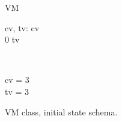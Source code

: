 \begin{figure}[H]
\centering
\begin{class}{VM}
\begin{state}
cv, tv: \integer
{} \leq  cv 
\\
0 \leq  tv 
\end{state} 
\\
\begin{init}
cv = 3
\\tv = 3
\end{init} 
\end{class}
\caption{VM class, initial state schema.}
\label{oz_vm_init_schema}
\end{figure}